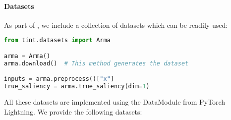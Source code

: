 \paragraph{Datasets}

As part of \texttt{}, we include a collection of datasets which can be readily used:

\begin{lstlisting}[language=Python, caption=Dataset loading example, label={lst:datasets}]
from tint.datasets import Arma

arma = Arma()
arma.download()  # This method generates the dataset

inputs = arma.preprocess()["x"]
true_saliency = arma.true_saliency(dim=1)
\end{lstlisting}

All these datasets are implemented using the DataModule from PyTorch Lightning.
We provide the following datasets:

